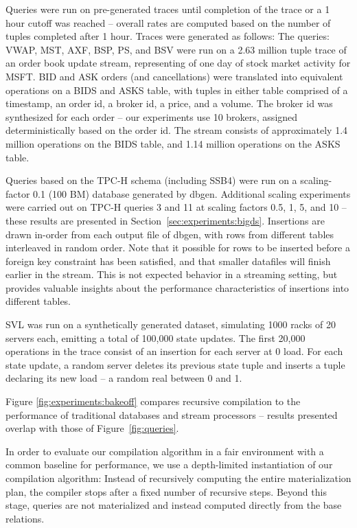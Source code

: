 Queries were run on pre-generated traces until completion of the trace or a 1 hour cutoff was reached -- overall rates are computed based on the number of tuples completed after 1 hour.  Traces were generated as follows: The queries: VWAP, MST, AXF, BSP, PS, and BSV were run on a 2.63 million tuple trace of an order book update stream, representing of one day of stock market activity for MSFT.  BID and ASK orders (and cancellations) were translated into equivalent operations on a BIDS and ASKS table, with tuples in either table comprised of a timestamp, an order id, a broker id, a price, and a volume.  The broker id was synthesized for each order -- our experiments use 10 brokers, assigned deterministically based on the order id.  The stream consists of approximately 1.4 million operations on the BIDS table, and 1.14 million operations on the ASKS table.

Queries based on the TPC-H schema (including SSB4) were run on a scaling-factor 0.1 (100 BM) database generated by dbgen\cite{tpch}.  Additional scaling experiments were carried out on TPC-H queries 3 and 11 at scaling factors 0.5, 1, 5, and 10 -- these results are presented in Section~\ref{sec:experiments:bigds}.  Insertions are drawn in-order from each output file of dbgen, with rows from different tables interleaved in random order.  Note that it possible for rows to be inserted before a foreign key constraint has been satisfied, and that smaller datafiles will finish earlier in the stream.  This is not expected behavior in a streaming setting, but provides valuable insights about the performance characteristics of insertions into different tables.

SVL was run on a synthetically generated dataset, simulating 1000 racks of 20 servers each, emitting a total of 100,000 state updates.  The first 20,000 operations in the trace consist of an insertion for each server at 0 load.  For each state update, a random server deletes its previous state tuple and inserts a tuple declaring its new load -- a random real between 0 and 1.

Figure \ref{fig:experiments:bakeoff} compares recursive compilation to the performance of traditional databases and stream processors -- results presented overlap with those of Figure~\ref{fig:queries}.  

In order to evaluate our compilation algorithm in a fair environment with a common baseline for performance, we use a depth-limited instantiation of our compilation algorithm: Instead of recursively computing the entire materialization plan, the compiler stops after a fixed number of recursive steps.  Beyond this stage, queries are not materialized and instead computed directly from the base relations.


